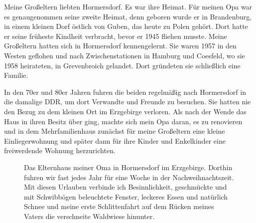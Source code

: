 \documentclass[fontsize=14pt,a4paper,headinclude,DIV=calc,automark]{scrbook}
\begin{document}
Meine Großeltern liebten Hormersdorf. Es war ihre Heimat. Für meinen Opa war es genaugenommen seine zweite Heimat, denn geboren wurde er in Brandenburg, in einem kleinen Dorf östlich von Guben, das heute zu Polen gehört. Dort hatte er seine früheste Kindheit verbracht, bevor er 1945 fliehen musste. Meine Großeltern hatten sich in Hormersdorf kennengelernt. Sie waren 1957 in den Westen geflohen und nach Zwischenstationen in Hamburg und Coesfeld, wo sie 1958 heirateten, in Grevenbroich gelandet. Dort gründeten sie schließlich eine Familie.

In den 70er und 80er Jahren fuhren die beiden regelmäßig nach Hormersdorf in die damalige DDR, um dort Verwandte und Freunde zu besuchen. Sie hatten nie den Bezug zu dem kleinen Ort im Erzgebirge verloren. Als nach der Wende das Haus in ihren Besitz über ging, machte sich mein Opa daran, es zu renovieren und in dem Mehrfamilienhaus zunächst für meine Großeltern eine kleine Einliegerwohnung und später dann für ihre Kinder und Enkelkinder eine freiwerdende Wohnung herzurichten.

\setlength{\fboxsep}{0pt}    %
\setlength{\fboxrule}{0.2pt} %
\begin{figure}[ht]
    \raggedright
    \caption{Das Elternhaus meiner Oma in Hormersdorf im Erzgebirge. Dorthin fuhren wir fast jedes Jahr für eine Woche in der Nachweihnachtszeit. Mit diesen Urlauben verbinde ich Besinnlichkeit, geschmückte und mit Schwibbögen beleuchtete Fenster, leckeres Essen und natürlich Schnee und meine erste Schlittenfahrt auf dem Rücken meines Vaters die verschneite Waldwiese hinunter.}
    \label{fig:hormersdorf1}
\end{figure}
\end{document}
